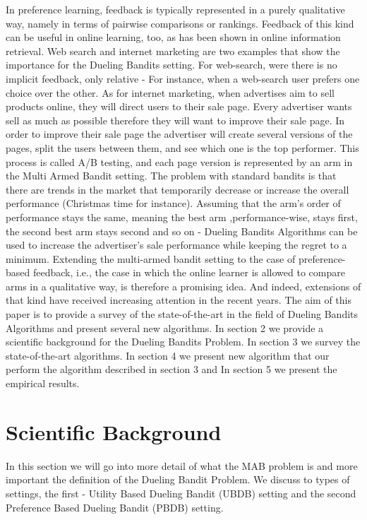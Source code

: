 \documentclass{llncs}
\begin{document}
	In preference learning, feedback is typically represented in a purely qualitative way, namely in terms of pairwise comparisons or rankings. 
	Feedback of this kind can be useful in online learning, too, as has been shown in online information retrieval.
	Web search and internet marketing are two examples that show the importance for the Dueling Bandits setting. For web-search, were there is no implicit feedback, only relative -  For instance, when a web-search user prefers one choice over the other.
	As for internet marketing, when advertises aim to sell products online, they will direct users to their sale page. 
	Every advertiser wants sell as much as possible therefore they will want to improve their sale page. In order to improve their sale page the advertiser will create several versions of the pages, split the users between them, and see which one is the top performer. This process is called A/B testing, and each page version is represented by an arm in the Multi Armed Bandit  setting. 
	The problem with standard bandits is that there are trends in the market that temporarily decrease or increase the overall performance (Christmas time for instance). 
	Assuming that the arm's order of performance stays the same, meaning the best arm ,performance-wise, stays first, the second best arm stays second and so on - Dueling Bandits Algorithms can be used to increase the advertiser's sale performance while keeping the regret to a minimum.	
	Extending the multi-armed bandit setting to the case of preference-based feedback, i.e., the case in which the online learner is allowed to compare arms in a qualitative way, is therefore a promising idea. 
	And indeed, extensions of that kind have received increasing attention in the recent years. 
	The aim of this paper is to provide a survey of the state-of-the-art in the field of Dueling Bandits Algorithms and present several new algorithms. 
	In section 2 we provide a scientific background for the Dueling Bandits Problem. In section 3 we survey the state-of-the-art algorithms. In section 4 we present new algorithm that our perform the algorithm described in section 3 and In section 5 we present the empirical results.
\newpage

\section{Scientific Background}
	In this section we will go into more detail of what the MAB problem is and more important the definition of the Dueling Bandit Problem. 
	We discuss to types of settings, the first - Utility Based Dueling Bandit (UBDB) setting and the second Preference Based Dueling Bandit (PBDB) setting.
\end{document}
